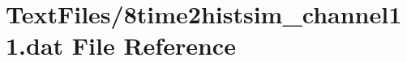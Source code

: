 \hypertarget{8time2histsim__channel11_8dat}{}\section{Text\+Files/8time2histsim\+\_\+channel11.dat File Reference}
\label{8time2histsim__channel11_8dat}
